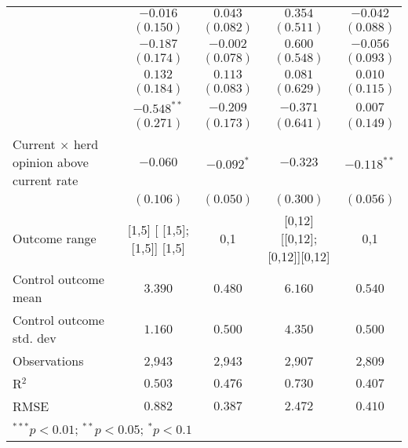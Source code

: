 \begin{table}
\begin{center}
\begin{tabular}{l c c c c}
                                                 & $-0.016$                     & $0.043$        & $0.354$                       & $-0.042$       \\
                                                 & $(0.150)$                    & $(0.082)$      & $(0.511)$                     & $(0.088)$      \\
                                                 & $-0.187$                     & $-0.002$       & $0.600$                       & $-0.056$       \\
                                                 & $(0.174)$                    & $(0.078)$      & $(0.548)$                     & $(0.093)$      \\
                                                 & $0.132$                      & $0.113$        & $0.081$                       & $0.010$        \\
                                                 & $(0.184)$                    & $(0.083)$      & $(0.629)$                     & $(0.115)$      \\
                                                 & $-0.548^{**}$                & $-0.209$       & $-0.371$                      & $0.007$        \\
                                                 & $(0.271)$                    & $(0.173)$      & $(0.641)$                     & $(0.149)$      \\
Current $\times$ herd opinion above current rate & $-0.060$                     & $-0.092^{*}$   & $-0.323$                      & $-0.118^{**}$  \\
                                                 & $(0.106)$                    & $(0.050)$      & $(0.300)$                     & $(0.056)$      \\
\hline
Outcome range                                    & [1,5] [ [1,5];  [1,5]] [1,5] & {0,1}          & [0,12] [[0,12]; [0,12]][0,12] & {0,1}          \\
Control outcome mean                             & $3.390$                      & $0.480$        & $6.160$                       & $0.540$        \\
Control outcome std. dev                         & $1.160$                      & $0.500$        & $4.350$                       & $0.500$        \\
Observations                                     & 2,943                        & 2,943          & 2,907                         & 2,809          \\
R$^{2}$                                          & $0.503$                      & $0.476$        & $0.730$                       & $0.407$        \\
RMSE                                             & $0.882$                      & $0.387$        & $2.472$                       & $0.410$        \\
\hline
\multicolumn{5}{l}{\scriptsize{$^{***}p<0.01$; $^{**}p<0.05$; $^{*}p<0.1$}}
\end{tabular}
\caption{}
\label{table:SI_table26_currentherdint_joint}
\end{center}
\end{table}
